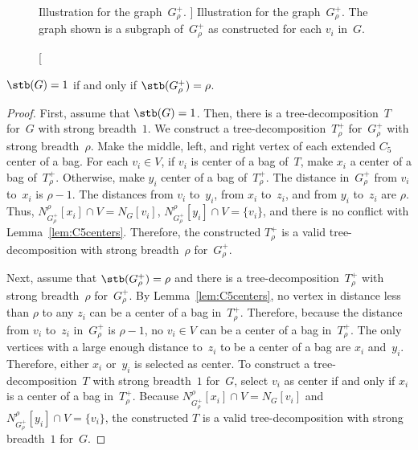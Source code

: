 \begin{figure}
    [htb]
    \centering
    
    \caption
    [%
        Illustration for the graph~$G^+_\rho$.
    ]
    {%
        Illustration for the graph~$G^+_\rho$.
        The graph shown is a subgraph of~$G^+_\rho$ as constructed for each $v_i$ in~$G$.
    }
    \label{fig:Gplus}
\end{figure}


\begin{lemma}
    \label{lem:Gplus}
\( \stb(G) = 1 \) if and only if \( \stb(G_\rho^+) = \rho \).
\end{lemma}

\begin{proof}
First, assume that $\stb(G) = 1$.
Then, there is a tree-decomposition~$T$ for~$G$ with strong breadth~$1$.
We construct a tree-decomposition~$T_\rho^+$ for~$G_\rho^+$ with strong breadth~$\rho$.
Make the middle, left, and right vertex of each extended $C_5$ center of a bag.
For each $v_i \in V$, if $v_i$ is center of a bag of~$T$, make $x_i$ a center of a bag of~$T_\rho^+$.
Otherwise, make $y_i$ center of a bag of~$T_\rho^+$.
%
The distance in~$G_\rho^+$ from $v_i$ to~$x_i$ is $\rho - 1$.
The distances from $v_i$ to~$y_i$, from $x_i$ to~$z_i$, and from $y_i$ to~$z_i$ are $\rho$.
Thus, $N_{G_\rho^+}^{\rho}[x_i] \cap V = N_G[v_i]$, $N_{G_\rho^+}^{\rho}[y_i] \cap V = \{ v_i \}$, and there is no conflict with Lemma~\ref{lem:C5centers}.
Therefore, the constructed $T_\rho^+$ is a valid tree-decomposition with strong breadth~$\rho$ for~$G_\rho^+$.

Next, assume that $\stb(G_\rho^+) = \rho$ and there is a tree-decomposition~$T_\rho^+$ with strong breadth~$\rho$ for~$G_\rho^+$.
By Lemma~\ref{lem:C5centers}, no vertex in distance less than $\rho$ to any $z_i$ can be a center of a bag in~$T_\rho^+$.
Therefore, because the distance from $v_i$ to~$z_i$ in~$G_\rho^+$ is $\rho - 1$, no $v_i \in V$ can be a center of a bag in~$T_\rho^+$.
The only vertices with a large enough distance to~$z_i$  to be a center of a bag are $x_i$ and~$y_i$.
Therefore, either $x_i$ or~$y_i$ is selected as center.
To construct a tree-decomposition~$T$ with strong breadth~$1$ for~$G$, select $v_i$ as center if and only if $x_i$ is a center of a bag in~$T_\rho^+$.
Because $N_{G_\rho^+}^{\rho}[x_i] \cap V = N_G[v_i]$ and $N_{G_\rho^+}^{\rho}[y_i] \cap V = \{ v_i \}$, the constructed $T$ is a valid tree-decomposition with strong breadth~$1$ for~$G$.
\end{proof}


